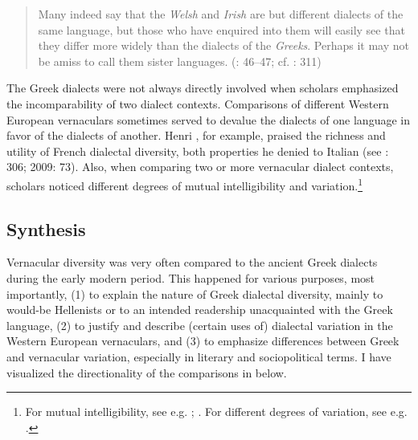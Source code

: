 \begin{quote}
Many indeed say that the \textit{Welsh} and \textit{Irish} are but different dialects of the same language, but those who have enquired into them will easily see that they differ more widely than the dialects of the \textit{Greeks}. Perhaps it may not be amiss to call them sister languages. (\citealt{Malcolm1738}: 46–47; cf. \citealt{Macnicol1779}: 311)
\end{quote}

The Greek dialects were not always directly involved when scholars emphasized the incomparability of two dialect contexts. Comparisons of different Western European vernaculars sometimes served to devalue the dialects of one language in favor of the dialects of another. Henri \citet[133--134]{Estienne1579}, for example, praised the richness and utility of French dialectal diversity, both properties he denied to Italian (see \citealt{Swiggers1997}: 306; 2009: 73). Also, when comparing two or more vernacular dialect contexts, scholars noticed different degrees of mutual intelligibility and variation.\footnote{For mutual intelligibility, see e.g. \citet[158\textsc{\textsuperscript{r}}\textsc{–158}\textsc{\textsuperscript{v}}]{Hosius1560}; \citet[77 – I refer to the German translation of the Swedish original, published in 1746/1747]{Hogstrom1748}. For different degrees of variation, see e.g. \citet[27, 57]{Sajnovics1770}.}

\subsection{Synthesis}

Vernacular diversity was very often compared to the ancient Greek dialects during the early modern period. This happened for various purposes, most importantly, (1) to explain the nature of Greek dialectal diversity, mainly to would-be Hellenists or to an intended readership unacquainted with the Greek language, (2) to justify and describe (certain uses of) dialectal variation in the Western European vernaculars, and (3) to emphasize differences between Greek and vernacular variation, especially in literary and sociopolitical terms. I have visualized the directionality of the comparisons in  below.

